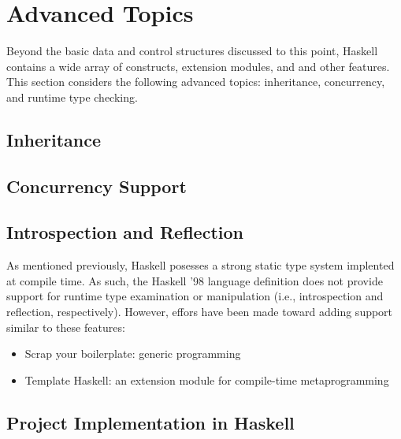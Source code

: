 \documentclass[titlepage,12pt]{article}
\newcommand{\bi}{\begin{itemize}}
\newcommand{\ei}{\end{itemize}}
\begin{document}
\section{Advanced Topics}
Beyond the basic data and control structures discussed to this point,
Haskell contains a wide array of constructs, extension modules, and
and other features.  This section considers the following advanced
topics: inheritance, concurrency, and runtime type checking.

\subsection{Inheritance}


\subsection{Concurrency Support}


\subsection{Introspection and Reflection}
As mentioned previously, Haskell posesses a strong static type system
implented at compile time. As such, the Haskell '98 language definition
does not provide support for runtime type examination or manipulation
(i.e., introspection and reflection, respectively).  However, effors have been
made toward adding support similar to these features:
\bi
    \item Scrap your boilerplate: generic programming~\cite{haskell-syb}
    \item Template Haskell: an extension module for compile-time metaprogramming~\cite{haskell-th}
\ei


\newpage
\begin{appendices}
\section{Project Implementation in Haskell}
\inputminted{haskell}{src/InfixPostfix.hs}
\newpage
\inputminted{haskell}{src/InfixPostfixTest.hs}
\end{appendices}


\newpage


\end{document}
